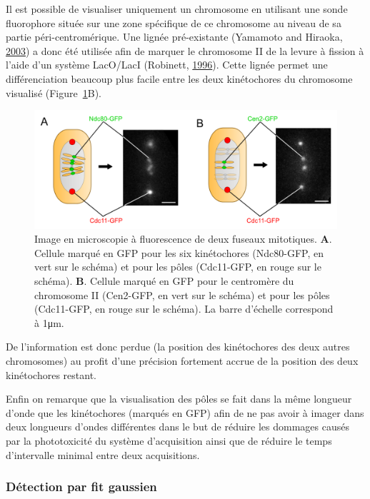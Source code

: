 \documentclass[12pt,a4paper,twoside,openright]{book}
\begin{document}
Il est possible de visualiser uniquement un chromosome en utilisant une
sonde fluorophore située sur une zone spécifique de ce chromosome au
niveau de sa partie péri-centromérique. Une lignée pré-existante
(Yamamoto and Hiraoka, \protect\hyperlink{ref-Yamamoto2003}{2003}) a
donc été utilisée afin de marquer le chromosome II de la levure à
fission à l'aide d'un système LacO/LacI (Robinett,
\protect\hyperlink{ref-Robinett1996}{1996}). Cette lignée permet une
différenciation beaucoup plus facile entre les deux kinétochores du
chromosome visualisé (Figure~\ref{fig:spindle_peaks}B).

\begin{figure}[htbp]
\centering
\includegraphics{figures/results/imaging/spindle_peaks.png}
\caption{\label{fig:spindle_peaks}Image en microscopie à fluorescence de
deux fuseaux mitotiques. \textbf{A}. Cellule marqué en GFP pour les six
kinétochores (Ndc80-GFP, en vert sur le schéma) et pour les pôles
(Cdc11-GFP, en rouge sur le schéma). \textbf{B}. Cellule marqué en GFP
pour le centromère du chromosome II (Cen2-GFP, en vert sur le schéma) et
pour les pôles (Cdc11-GFP, en rouge sur le schéma). La barre d'échelle
correspond à 1μm.}
\end{figure}

De l'information est donc perdue (la position des kinétochores des deux
autres chromosomes) au profit d'une précision fortement accrue de la
position des deux kinétochores restant.

Enfin on remarque que la visualisation des pôles se fait dans la même
longueur d'onde que les kinétochores (marqués en GFP) afin de ne pas
avoir à imager dans deux longueurs d'ondes différentes dans le but de
réduire les dommages causés par la phototoxicité du système
d'acquisition ainsi que de réduire le temps d'intervalle minimal entre
deux acquisitions.

\subsubsection{Détection par fit
gaussien}\label{duxe9tection-par-fit-gaussien}
\end{document}
